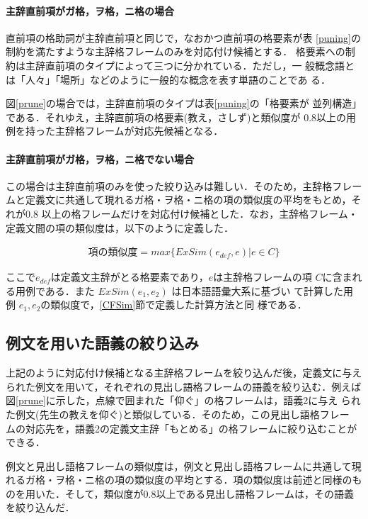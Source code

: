 \paragraph{主辞直前項がガ格，ヲ格，ニ格の場合}

直前項の格助詞が主辞直前項と同じで，なおかつ直前項の格要素が表
\ref{puning}の制約を満たすような主辞格フレームのみを対応付け候補とする．
格要素への制約は主辞直前項のタイプによって三つに分かれている．ただし，一
般概念語とは「人々」「場所」などのように一般的な概念を表す単語のことであ
る．

図\ref{prune}の場合では，主辞直前項のタイプは表\ref{puning}の「格要素が
並列構造」である．それゆえ，主辞直前項の格要素(教え，さしず)と類似度が
0.8以上の用例を持った主辞格フレームが対応先候補となる．





\paragraph{主辞直前項がガ格，ヲ格，ニ格でない場合}

この場合は主辞直前項のみを使った絞り込みは難しい．そのため，主辞格フレー
ムと定義文に共通して現れるガ格・ヲ格・ニ格の項の類似度の平均をもとめ，そ
れが0.8 以上の格フレームだけを対応付け候補とした．なお，主辞格フレーム・
定義文間の項の類似度は，以下のように定義した．

\begin{eqnarray*}
  項の類似度 = max \{ ExSim(e_{def},e) | e \in C \}
\end{eqnarray*}

ここで$e_{def}$は定義文主辞がとる格要素であり，$e$は主辞格フレームの項
$C$に含まれる用例である．また $ExSim(e_1,e_2)$ は日本語語彙大系に基づい
て計算した用例 $e_1,e_2$の類似度で，\ref{CFSim}節で定義した計算方法と同
様である．


\subsection{例文を用いた語義の絞り込み}

上記のように対応付け候補となる主辞格フレームを絞り込んだ後，定義文に与え
られた例文を用いて，それぞれの見出し語格フレームの語義を絞り込む．例えば
図\ref{prune}に示した，点線で囲まれた「仰ぐ」の格フレームは，語義2に与え
られた例文(先生の教えを仰ぐ)と類似している．そのため，この見出し語格フレー
ムの対応先を，語義2の定義文主辞「もとめる」の格フレームに絞り込むことが
できる．

例文と見出し語格フレームの類似度は，例文と見出し語格フレームに共通して現
れるガ格・ヲ格・ニ格の項の類似度の平均とする．項の類似度は前述と同様のも
のを用いた．そして，類似度が0.8以上である見出し語格フレームは，その語義
を絞り込んだ．

